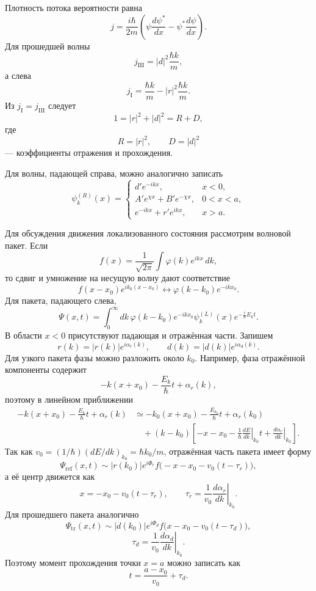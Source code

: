 \documentclass[12pt,a4paper]{article}
\begin{document}
Плотность потока вероятности равна
\[
    j=\frac{i\hbar}{2m}
    \left(\psi\frac{d\psi^*}{dx}-\psi^*\frac{d\psi}{dx}\right).
\]
Для прошедшей волны
\[
    j_{\mathrm{III}}=|d|^2\frac{\hbar k}{m},
\]
а слева
\[
    j_{\mathrm I}=\frac{\hbar k}{m}
    -|r|^2\frac{\hbar k}{m}.
\]
Из $j_{\mathrm I}=j_{\mathrm{III}}$ следует
\[
    \boxed{1=|r|^2+|d|^2=R+D},
\]
где
\[
    R=|r|^2,
    \qquad
    D=|d|^2
\]
--- коэффициенты отражения и прохождения.

Для волны, падающей справа, можно аналогично записать
\[
    \psi_k^{(R)}(x)=
    \begin{cases}
        d'e^{-ikx}, & x<0,\\
        A'e^{\chi x}+B'e^{-\chi x}, & 0<x<a,\\
        e^{-ikx}+r'e^{ikx}, & x>a.
    \end{cases}
\]

Для обсуждения движения локализованного состояния рассмотрим волновой
пакет. Если
\[
    f(x)=\frac{1}{\sqrt{2\pi}}\int\varphi(k)e^{ikx}\,dk,
\]
то сдвиг и умножение на несущую волну дают соответствие
\[
    f(x-x_0)e^{ik_0(x-x_0)}
    \longleftrightarrow
    \varphi(k-k_0)e^{-ikx_0}.
\]
Для пакета, падающего слева,
\[
    \Psi(x,t)=\int_0^\infty dk\,\varphi(k-k_0)e^{-ikx_0}
    \psi_k^{(L)}(x)e^{-\frac{i}{\hbar}E_kt}.
\]
В области $x<0$ присутствуют падающая и отражённая части. Запишем
\[
    r(k)=|r(k)|e^{i\alpha_r(k)},
    \qquad
    d(k)=|d(k)|e^{i\alpha_d(k)}.
\]
Для узкого пакета фазы можно разложить около $k_0$. Например, фаза
отражённой компоненты содержит
\[
    -k(x+x_0)-\frac{E_k}{\hbar}t+\alpha_r(k),
\]
поэтому в линейном приближении
\begin{align*}
    -k(x+x_0)-\frac{E_k}{\hbar}t+\alpha_r(k)
    &\simeq -k_0(x+x_0)-\frac{E_{k_0}}{\hbar}t+\alpha_r(k_0) \\
    &\quad +(k-k_0)\left[-x-x_0-\frac{1}{\hbar}
    \left.\frac{dE}{dk}\right|_{k_0}t
    +\left.\frac{d\alpha_r}{dk}\right|_{k_0}\right].
\end{align*}
Так как $v_0=(1/\hbar)(dE/dk)_{k_0}=\hbar k_0/m$, отражённая часть
пакета имеет форму
\[
    \Psi_{\mathrm{ref}}(x,t)
    \sim |r(k_0)|e^{i\Phi_r}
    f\bigl(-x-x_0-v_0(t-\tau_r)\bigr),
\]
а её центр движется как
\[
    x=-x_0-v_0(t-\tau_r),
    \qquad
    \boxed{\tau_r=\frac{1}{v_0}
    \left.\frac{d\alpha_r}{dk}\right|_{k_0}}.
\]
Для прошедшего пакета аналогично
\[
    \Psi_{\mathrm{tr}}(x,t)
    \sim |d(k_0)|e^{i\Phi_d}
    f\bigl(x-x_0-v_0(t-\tau_d)\bigr),
\]
\[
    \boxed{\tau_d=\frac{1}{v_0}
    \left.\frac{d\alpha_d}{dk}\right|_{k_0}}.
\]
Поэтому момент прохождения точки $x=a$ можно записать как
\[
    t=\frac{a-x_0}{v_0}+\tau_d.
\]
\end{document}
